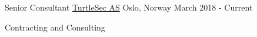 

\begin{cventries}

  \cventry
    {Senior Consultant} %
    {\href{https://turtlesec.no/}{TurtleSec AS}} %
    {Oslo, Norway} %
    {March 2018 - Current} %
    {
      \begin{cvitems} %
        \item {Contracting and Consulting}
      \end{cvitems}
    }

\end{cventries}
